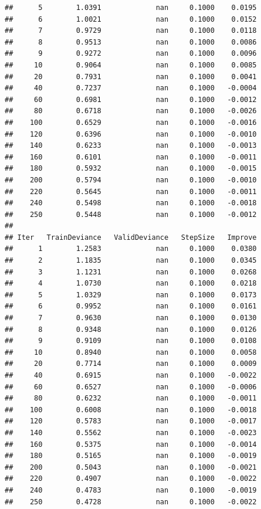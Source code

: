 \documentclass[
]{book}
\begin{document}
\begin{verbatim}
##      5        1.0391             nan     0.1000    0.0195
##      6        1.0021             nan     0.1000    0.0152
##      7        0.9729             nan     0.1000    0.0118
##      8        0.9513             nan     0.1000    0.0086
##      9        0.9272             nan     0.1000    0.0096
##     10        0.9064             nan     0.1000    0.0085
##     20        0.7931             nan     0.1000    0.0041
##     40        0.7237             nan     0.1000   -0.0004
##     60        0.6981             nan     0.1000   -0.0012
##     80        0.6718             nan     0.1000   -0.0026
##    100        0.6529             nan     0.1000   -0.0016
##    120        0.6396             nan     0.1000   -0.0010
##    140        0.6233             nan     0.1000   -0.0013
##    160        0.6101             nan     0.1000   -0.0011
##    180        0.5932             nan     0.1000   -0.0015
##    200        0.5794             nan     0.1000   -0.0010
##    220        0.5645             nan     0.1000   -0.0011
##    240        0.5498             nan     0.1000   -0.0018
##    250        0.5448             nan     0.1000   -0.0012
## 
## Iter   TrainDeviance   ValidDeviance   StepSize   Improve
##      1        1.2583             nan     0.1000    0.0380
##      2        1.1835             nan     0.1000    0.0345
##      3        1.1231             nan     0.1000    0.0268
##      4        1.0730             nan     0.1000    0.0218
##      5        1.0329             nan     0.1000    0.0173
##      6        0.9952             nan     0.1000    0.0161
##      7        0.9630             nan     0.1000    0.0130
##      8        0.9348             nan     0.1000    0.0126
##      9        0.9109             nan     0.1000    0.0108
##     10        0.8940             nan     0.1000    0.0058
##     20        0.7714             nan     0.1000    0.0009
##     40        0.6915             nan     0.1000   -0.0022
##     60        0.6527             nan     0.1000   -0.0006
##     80        0.6232             nan     0.1000   -0.0011
##    100        0.6008             nan     0.1000   -0.0018
##    120        0.5783             nan     0.1000   -0.0017
##    140        0.5562             nan     0.1000   -0.0023
##    160        0.5375             nan     0.1000   -0.0014
##    180        0.5165             nan     0.1000   -0.0019
##    200        0.5043             nan     0.1000   -0.0021
##    220        0.4907             nan     0.1000   -0.0022
##    240        0.4783             nan     0.1000   -0.0019
##    250        0.4728             nan     0.1000   -0.0022

\end{verbatim}
\end{document}
